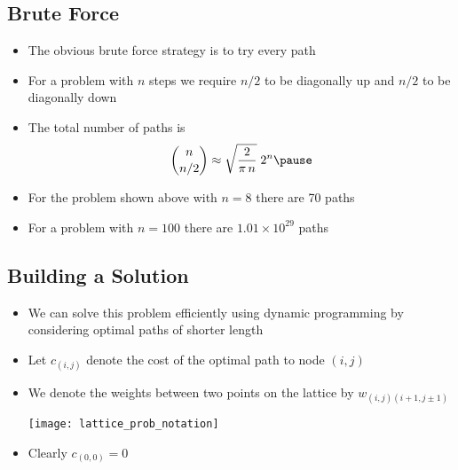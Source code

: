 
\begin{slide}
\section[-0.5]{Brute Force}

\begin{PauseHighLight}
  \begin{itemize}
  \item The obvious brute force strategy is to try every path\pause
  \item For a problem with $n$ steps we require $n/2$ to be diagonally
    up and $n/2$ to be diagonally down\pause
  \item The total number of paths is
    \begin{align*}
      \binom{n}{n/2} \approx \sqrt{\frac{2}{\pi\,n}}\; 2^n\pause
    \end{align*}
  \item For the problem shown above with $n=8$ there are 70
    paths\pause
  \item For a problem with $n=100$ there are $1.01\times10^{29}$
    paths\pause
  \end{itemize}
\end{PauseHighLight}

\end{slide}


\begin{slide}
\section[-2]{Building a Solution}

\begin{PauseHighLight}
  \begin{itemize}
  \item We can solve this problem efficiently using dynamic programming
    by considering optimal paths of shorter length\pause
  \item Let $c_{(i,j)}$ denote the cost of the optimal path to node
    $(i,j)$\pause
  \item We denote the weights between two points on the lattice by
    $w_{(i,j)(i+1,j\pm1)}$
    \begin{center}
      \texttt{[image: lattice\_prob\_notation]}\pause
    \end{center}
  \item Clearly $c_{(0,0)}=0$\pause
  \end{itemize}
\end{PauseHighLight}

\end{slide}


